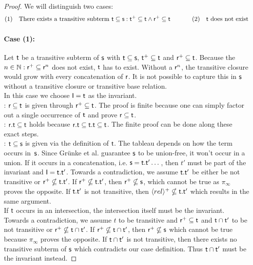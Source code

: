 \documentclass[a4paper,twoside,12pt, english]{article}
\begin{document}
\begin{proof}
We will distinguish two cases:
\[(1) \quad \text{There exists a transitive subterm }\relt \subseteq \rels: \relt^+ \subseteq \relt \land \relr^+ \subseteq \relt \hspace*{0.1\textwidth} (2) \quad \relt \text{ does not exist}\]

\newpage
\paragraph{Case (1):}
Let $\textsf{\upshape t}$ be a transitive subterm of $\textsf{\upshape s}$ with $\textsf{\upshape t} \subseteq \textsf{\upshape s}$, $\textsf{\upshape t}^+ \subseteq \textsf{\upshape t}$ and $\textsf{\upshape r}^+ \subseteq \textsf{\upshape t}$. Because the~$n \in \mathbb{N}: \textsf{\upshape r}^+ \subseteq \textsf{\upshape r}^n$ does not exist, $\textsf{\upshape t}$ has to exist. Without a $\textsf{\upshape r}^n$, the transitive closure would grow with every concatenation of $\textsf{\upshape r}$. It is not possible to capture this in $\textsf{\upshape s}$ without a transitive closure or transitive base relation. \\
In this case we choose $\textsf{\upshape I} = \textsf{\upshape t}$ as the invariant. \\
\propl : $\textsf{\upshape r} \subseteq \textsf{\upshape t}$ is given through $\textsf{\upshape r}^+ \subseteq \textsf{\upshape t}$. The proof is finite because one can simply factor out a single occurrence of $\textsf{\upshape t}$ and prove $\textsf{\upshape r} \subseteq \textsf{\upshape t} $. \\
\propz : $\textsf{\upshape r}.\textsf{\upshape t} \subseteq \textsf{\upshape t}$ holds because $\textsf{\upshape r}.\textsf{\upshape t} \subseteq \textsf{\upshape t}.\textsf{\upshape t} \subseteq \textsf{\upshape t}$. The finite proof can be done along these exact steps. \\
\prope : $\textsf{\upshape t} \subseteq \textsf{\upshape s}$ is given via the definition of $\textsf{\upshape t}$. The tableau depends on how the term occurs in~$\textsf{\upshape s}$. Since Grünke et al. guarantee $\textsf{\upshape s}$ to be union-free, it won't occur in a union. 
If it occurs in a concatenation, i.e. $\textsf{\upshape s} = \textsf{\upshape t}.\textsf{\upshape t}' \dots $, then $t'$ must be part of the invariant and $\textsf{\upshape I} = \textsf{\upshape t}.\textsf{\upshape t}'$. Towards a contradiction, we assume $\textsf{\upshape t}.\textsf{\upshape t}'$ be either be not transitive or $\textsf{\upshape r}^+ \nsubseteq \textsf{\upshape t}.\textsf{\upshape t}'$. If $\textsf{\upshape r}^+ \nsubseteq \textsf{\upshape t}.\textsf{\upshape t}'$, then $\textsf{\upshape r}^+ \nsubseteq \textsf{\upshape s}$, which cannot be true as $\pi_\infty$ proves the opposite. If $\textsf{\upshape t}.\textsf{\upshape t}'$ is not transitive, then $\langle rel \rangle^+ \nsubseteq \textsf{\upshape t}.\textsf{\upshape t}'$ which results in the same argument. \\
If $\textsf{\upshape t}$ occurs in an intersection, the intersection itself must be the invariant. Towards a contradiction, we assume $t$ to be transitive and $\textsf{\upshape r}^+ \subseteq \textsf{\upshape t}$ and $\textsf{\upshape t} \cap \textsf{\upshape t}'$ to be not transitive or $\textsf{\upshape r}^+ \nsubseteq \textsf{\upshape t} \cap \textsf{\upshape t}'$. 
If $\textsf{\upshape r}^+ \nsubseteq \textsf{\upshape t} \cap \textsf{\upshape t}'$, then $\textsf{\upshape r}^+ \nsubseteq \textsf{\upshape s}$ which cannot be true because $\pi_\infty$ proves the opposite. If $\textsf{\upshape t} \cap \textsf{\upshape t}'$ is not transitive, then there exists no transitive subterm of $\textsf{\upshape s}$ which contradicts our case definition. Thus $\textsf{\upshape t} \cap \textsf{\upshape t}'$ must be the invariant instead.


\end{proof}
\end{document}
